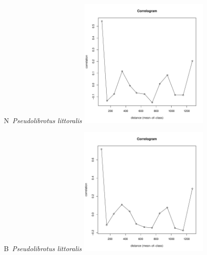 \documentclass[12pt, a4paper]{disser}
\begin{document}
\begin{figure}[h]
	
	\begin{minipage}[b]{.46\linewidth}
	\begin{center}
	{\small N~{\it Pseudolibrotus littoralis}}
	\includegraphics[width=65mm]{../Barenc_Sea/distribution_Moran/Plyazh082_moran_N_Pseudolibrotus_littoralis_.pdf}

	\end{center}
	\end{minipage}
	\hfil %
	\begin{minipage}[b]{.46\linewidth}
	\begin{center}
	{\small B~{\it Pseudolibrotus littoralis}}
		\includegraphics[width=65mm]{../Barenc_Sea/distribution_Moran/Plyazh082_moran_B_Pseudolibrotus_littoralis_.pdf}
	\end{center}
	\end{minipage}






\end{figure}
\end{document}
